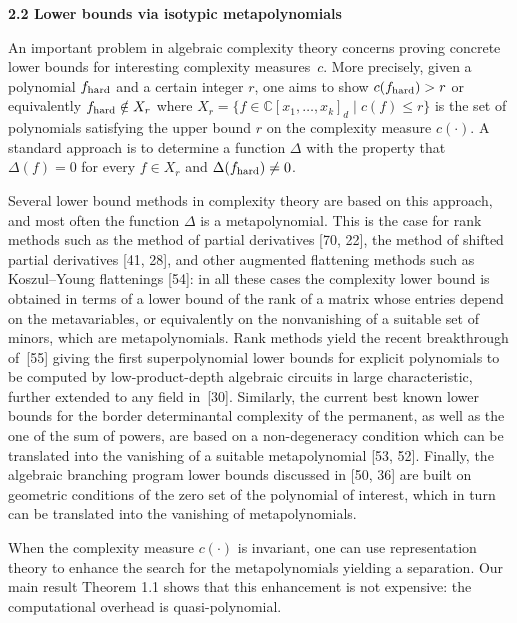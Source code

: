 \documentclass[10pt,a4paper]{article}
\begin{document}
\par\medskip\noindent\textbf{2.2 Lower bounds via isotypic metapolynomials}\par




An important problem in algebraic complexity theory concerns proving concrete lower bounds for interesting complexity measures $c$. More precisely, given a polynomial $f_{\textup{hard}}$ and a certain integer $r$, one aims to show $c(f_{{\textup{hard}}})>r$ or equivalently $f_{{\textup{hard}}}\notin X_{r}$ where $X_{r}=\{f\in\mathbb{C}[x_{1},\ldots,x_{k}]_{d}\mid c(f)\leq r\}$ is the set of polynomials satisfying the upper bound $r$ on the complexity measure $c(\cdot)$. A standard approach is to determine a function $\Delta$ with the property that $\Delta(f)=0$ for every $f\in X_{r}$ and $\Delta(f_{\textup{hard}})\neq 0$.





Several lower bound methods in complexity theory are based on this approach, and most often the function $\Delta$ is a metapolynomial. This is the case for rank methods such as the method of partial derivatives [70, 22], the method of shifted partial derivatives [41, 28], and other augmented flattening methods such as Koszul–Young flattenings [54]: in all these cases the complexity lower bound is obtained in terms of a lower bound of the rank of a matrix whose entries depend on the metavariables, or equivalently on the nonvanishing of a suitable set of minors, which are metapolynomials. Rank methods yield the recent breakthrough of [55] giving the first superpolynomial lower bounds for explicit polynomials to be computed by low-product-depth algebraic circuits in large characteristic, further extended to any field in [30].
Similarly, the current best known lower bounds for the border determinantal complexity of the permanent, as well as the one of the sum of powers, are based on a non-degeneracy condition which can be translated into the vanishing of a suitable metapolynomial [53, 52]. Finally, the algebraic branching program lower bounds discussed in [50, 36] are built on geometric conditions of the zero set of the polynomial of interest, which in turn can be translated into the vanishing of metapolynomials.





When the complexity measure $c(\cdot)$ is invariant, one can use representation theory to enhance the search for the metapolynomials yielding a separation. Our main result Theorem 1.1 shows that this enhancement is not expensive: the computational overhead is quasi-polynomial.
\end{document}
